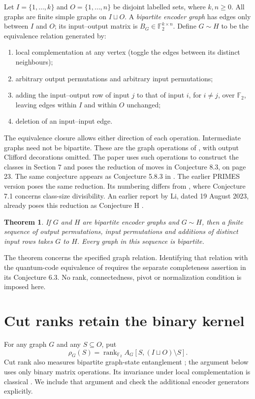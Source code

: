 \documentclass[11pt]{article}
\newtheorem{theorem}{Theorem}
\newcommand{\F}{\mathbb F_2}
\newcommand{\rk}{\operatorname{rank}}
\begin{document}
Let $I=\{1,\ldots,k\}$ and $O=\{1,\ldots,n\}$ be disjoint labelled sets,
where $k,n\geq0$. All graphs are finite simple graphs on $I\sqcup O$.
A \emph{bipartite encoder graph} has edges only between $I$ and $O$;
its input--output matrix is $B_G\in\F^{k\times n}$.
Define $G\sim H$ to be the equivalence relation generated by:
\begin{enumerate}
\item local complementation at any vertex (toggle the edges between its distinct neighbours);
\item arbitrary output permutations and arbitrary input permutations;
\item adding the input--output row of input $j$ to that of input $i$, for $i\ne j$, over $\F$, leaving edges within $I$ and within $O$ unchanged;
\item deletion of an input--input edge.
\end{enumerate}
The equivalence closure allows either direction of each operation.
Intermediate graphs need not be bipartite.
These are the graph operations of \cite[Conjecture 6.3]{KL}, with output
Clifford decorations omitted. The paper uses such operations to construct
the classes in Section 7 and poses the reduction of moves in Conjecture 8.3,
on page 23. The same conjecture appears as Conjecture 5.8.3 in
\cite[Chapter 5]{Khesin}.
The earlier PRIMES version \cite[Section 7, Conjecture 7.1, p.~14]{KL0}
poses the same reduction. Its numbering differs from \cite{KL}, where
Conjecture 7.1 concerns class-size divisibility.
An earlier report by Li, dated 19 August 2023, already poses this
reduction as Conjecture H \cite[Section VII, printed p.~20]{Li}.

\begin{theorem}\label{thm:main}
If $G$ and $H$ are bipartite encoder graphs and $G\sim H$, then a finite
sequence of output permutations, input permutations and additions of
distinct input rows takes $G$ to $H$. Every graph in this sequence is
bipartite.
\end{theorem}

The theorem concerns the specified graph relation. Identifying that relation
with the quantum-code equivalence of \cite[Definition 6.2]{KL} requires
the separate completeness assertion in its Conjecture 6.3.
No rank, connectedness, pivot or normalization condition is imposed here.

\section{Cut ranks retain the binary kernel}
For any graph $G$ and any $S\subseteq O$, put
\[
 \rho_G(S)=\rk_{\F} A_G[S,(I\sqcup O)\setminus S].
\]
Cut rank also measures bipartite graph-state entanglement
\cite[Proposition 3, equation (43)]{Hein}; the argument below uses only
binary matrix operations.
Its invariance under local complementation is classical
\cite[Proposition 2.6, p.~8]{Oum}. We include that argument and check
the additional encoder generators explicitly.
\end{document}
